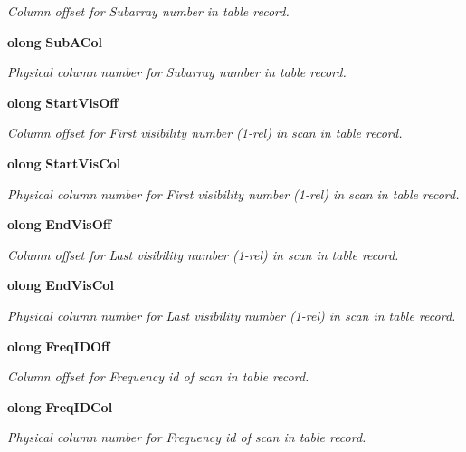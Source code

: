\begin{CompactItemize}
\begin{CompactList}\small\item\em Column offset for Subarray number in table record. \item\end{CompactList}\item 
{\bf olong} {\bf Sub\-ACol}
\begin{CompactList}\small\item\em Physical column number for Subarray number in table record. \item\end{CompactList}\item 
{\bf olong} {\bf Start\-Vis\-Off}
\begin{CompactList}\small\item\em Column offset for First visibility number (1-rel) in scan in table record. \item\end{CompactList}\item 
{\bf olong} {\bf Start\-Vis\-Col}
\begin{CompactList}\small\item\em Physical column number for First visibility number (1-rel) in scan in table record. \item\end{CompactList}\item 
{\bf olong} {\bf End\-Vis\-Off}
\begin{CompactList}\small\item\em Column offset for Last visibility number (1-rel) in scan in table record. \item\end{CompactList}\item 
{\bf olong} {\bf End\-Vis\-Col}
\begin{CompactList}\small\item\em Physical column number for Last visibility number (1-rel) in scan in table record. \item\end{CompactList}\item 
{\bf olong} {\bf Freq\-IDOff}
\begin{CompactList}\small\item\em Column offset for Frequency id of scan in table record. \item\end{CompactList}\item 
{\bf olong} {\bf Freq\-IDCol}
\begin{CompactList}\small\item\em Physical column number for Frequency id of scan in table record. \item\end{CompactList}\end{CompactItemize}


